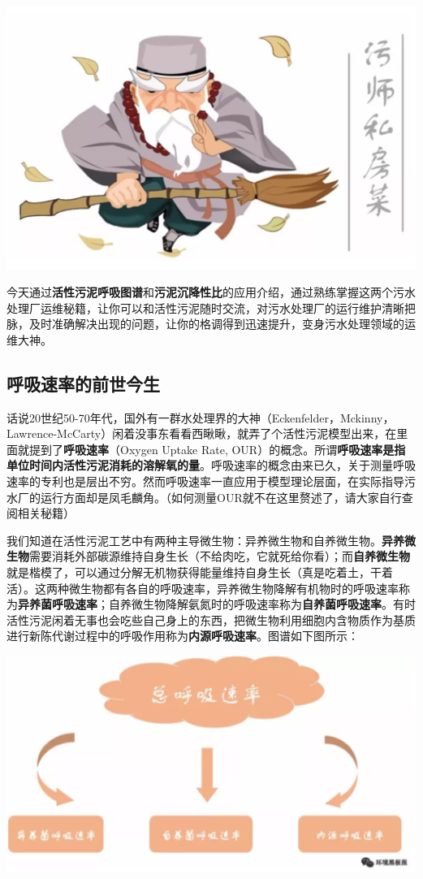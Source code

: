 \documentclass[]{book}
\begin{document}
\includegraphics[width=6.67in]{images/os1}

今天通过\textbf{活性污泥呼吸图谱}和\textbf{污泥沉降性比}的应用介绍，通过熟练掌握这两个污水处理厂运维秘籍，让你可以和活性污泥随时交流，对污水处理厂的运行维护清晰把脉，及时准确解决出现的问题，让你的格调得到迅速提升，变身污水处理领域的运维大神。

\subsection{呼吸速率的前世今生}

话说20世纪50-70年代，国外有一群水处理界的大神（Eckenfelder，Mckinny，Lawrence-McCarty）闲着没事东看看西瞅瞅，就弄了个活性污泥模型出来，在里面就提到了\textbf{呼吸速率}（Oxygen
Uptake Rate,
OUR）的概念。所谓\textbf{呼吸速率是指单位时间内活性污泥消耗的溶解氧的量}。呼吸速率的概念由来已久，关于测量呼吸速率的专利也是层出不穷。然而呼吸速率一直应用于模型理论层面，在实际指导污水厂的运行方面却是凤毛麟角。（如何测量OUR就不在这里赘述了，请大家自行查阅相关秘籍）

我们知道在活性污泥工艺中有两种主导微生物：异养微生物和自养微生物。\textbf{异养微生物}需要消耗外部碳源维持自身生长（不给肉吃，它就死给你看）；而\textbf{自养微生物}就是楷模了，可以通过分解无机物获得能量维持自身生长（真是吃着土，干着活）。这两种微生物都有各自的呼吸速率，异养微生物降解有机物时的呼吸速率称为\textbf{异养菌呼吸速率}；自养微生物降解氨氮时的呼吸速率称为\textbf{自养菌呼吸速率}。有时活性污泥闲着无事也会吃些自己身上的东西，把微生物利用细胞内含物质作为基质进行新陈代谢过程中的呼吸作用称为\textbf{内源呼吸速率}。图谱如下图所示：

\includegraphics[width=6.67in]{images/os2}
\end{document}
